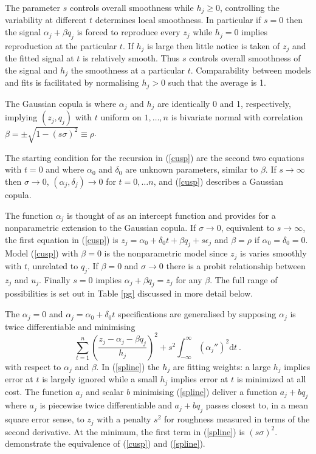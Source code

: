 \documentclass[authoryear]{elsarticle}
\newcommand{\eps}{\epsilon}
\newcommand{\de}{\mathrm{d}}
\newcommand{\eref}[1]{(\ref{#1})}
\newcommand{\tref}[1]{Table \ref{#1}}
\newcommand{\be}[1]{\begin{equation}\label{#1}}
\newcommand{\ee}{\end{equation}}
\begin{document}
The parameter $s$ controls overall smoothness while  $h_j\ge 0$,  controlling the variability at different $t$ determines local smoothness.
In particular if $s=0$ then the signal $\alpha_j+\beta q_j$ is forced to reproduce every  $z_j$ while $h_j=0$ implies reproduction at the particular $t$.     If $h_j$ is large then little notice is taken of $z_j$ and the fitted signal at $t$ is relatively smooth.  Thus $s$ controls overall smoothness of the signal and  $h_j$ the smoothness at a particular $t$.  Comparability between models and fits is facilitated by normalising $h_j>0$ such that the average  is 1.  


The Gaussian copula is where $\alpha_j$ and $h_j$ are  identically 0 and  1, respectively, implying  $(z_j,q_j)$ with $t$ uniform on $1,\ldots,n$  is bivariate normal  with correlation $\beta=\pm\sqrt{1-(s\sigma)^2}\equiv\rho$.    

The starting condition for the recursion in \eref{cusp} are the second two equations with $t=0$ and where $\alpha_0$ and $\delta_0$ are  unknown parameters, similar to $\beta$. If $s\rightarrow\infty$ then $\sigma\rightarrow 0$,  $(\alpha_j,\delta_j)\rightarrow 0$ for $t=0,\ldots n$, and \eref{cusp} describes a Gaussian copula.  

The function $\alpha_j$ is thought of as an intercept function and provides for a nonparametric extension to the Gaussian copula.  If $\sigma\rightarrow 0$, equivalent to $s\rightarrow\infty$,  the first equation in \eref{cusp} is
$
z_j = \alpha_0+\delta_0 t + \beta q_j + s\eps_j
$
and  $\beta=\rho$ if $\alpha_0=\delta_0=0$.    Model \eref{cusp} with  $\beta=0$ is the  nonparametric model since $z_j$ is varies smoothly with $t$, unrelated to $q_j$.  If $\beta=0$ and $\sigma\rightarrow 0$ there is a probit relationship between $z_j$ and $u_j$.  Finally $s=0$ implies $\alpha_j+\beta q_j=z_j$ for any $\beta$.   The full range of possibilities is set out in \tref{pg} discussed in more detail below.  

The $\alpha_j=0$ and $\alpha_j=\alpha_0+\delta_0 t$ specifications are generalised by supposing $\alpha_j$ is twice differentiable and minimising
\be{spline}
 \sum_{t=1}^n\left(\frac{z_j-\alpha_j-\beta q_j}{h_j}\right)^2 + s^2\int_{-\infty}^{\infty} \left(\alpha_j''\right)^2\de t\ .
\ee
with respect to $\alpha_j$ and $\beta$.
 In \eref{spline} the $h_j$  are fitting weights: a large  $h_j$ implies  error at $t$ is largely ignored while a small $h_j$ implies  error at $t$ is  minimized at all cost.  The function $a_j$ and scalar $b$ minimising \eref{spline} deliver a function $a_j+bq_j$ where $a_j$ is piecewise twice differentiable and $a_j+bq_j$ passes closest to, in a mean square error sense, to $z_j$  with a penalty $s^2$ for  roughness measured in terms of the second derivative.   At the minimum, the first term in \eref{spline} is $(s\sigma)^2$.   \cite{Brown&DeJong:2001} demonstrate the equivalence of \eref{cusp} and \eref{spline}.
\end{document}

